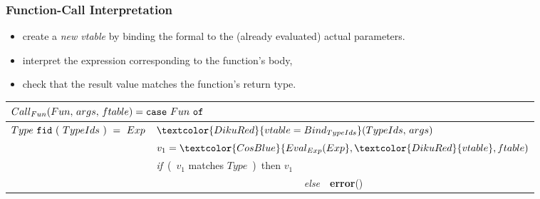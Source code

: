 \documentclass{beamer}
\newcommand{\emp}[1]{\textcolor{DikuRed}{ #1}}
\newcommand{\emphb}[1]{\textcolor{CosBlue}{ #1}}
\begin{document}
\begin{frame}
\frametitle{Function-Call Interpretation}

\begin{itemize}
    \item create a {\em new vtable} by binding the \emp{formal} to the 
            (already evaluated) \emp{actual parameters}.\smallskip
    \item \emphb{interpret} the expression corresponding to the function's body,\smallskip
    \item \alert{check} that the result value matches the function's return type.
\end{itemize}

\bigskip

\begin{tabular}{|l|l|}\hline
\multicolumn{2}{|l|}{$Call_{Fun}(Fun,\,args,\,ftable)
 = \mbox{\tt case}~Fun~\mbox{\tt of} $} \\\hline

$Type~{\tt fid}~(~TypeIds~)~=~Exp$
        & $\emp{vtable = Bind_{TypeIds}}(TypeIds,\,args)$ \\
        & $v_1 = \emphb{Eval_{Exp}(Exp},\emp{vtable},ftable)$ \\
        & {\em if}~(~\alert{$v_1$  matches $Type$}~)~then $v_1$ \\
        & {\em ~~~~~~~~~~~~~~~~~~~~~~~~~~~~~else}~~{\bf error}()\\\hline
\end{tabular}

\end{frame}
\end{document}

